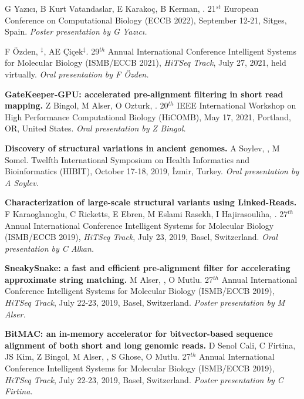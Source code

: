 \vspace{-.2cm}{\bf Identification of protein-protein interaction
bridges in multiple sclerosis.} G Yazıcı, B Kurt Vatandaslar, E Karakoç, B Kerman, \calkan{}.
21$^{st}$ European Conference on Computational Biology (ECCB 2022), September 12-21, Sitges, Spain. 
{\it Poster presentation by G Yazıcı.}

\vspace{-.2cm}{\bf Polishing copy number variant calls on exome sequencing data via deep learning.}
F Özden, \calkan{}$^\ddag$, AE Çiçek$^\ddag$. 29$^{th}$ Annual
International Conference Intelligent Systems for Molecular Biology (ISMB/ECCB 2021), {\em HiTSeq Track},
 July 27, 2021, held virtually. {\it Oral presentation by F Özden.}


\vspace{-.2cm}
{\bf GateKeeper-GPU: accelerated pre-alignment filtering in short read mapping.} Z Bingol, M Alser, O Ozturk, \calkan{}. 20$^{th}$ IEEE International Workshop on High Performance Computational Biology (HiCOMB), May 17, 2021, Portland, OR, United States.
{\it Oral presentation by Z Bingol.}



\vspace{-.2cm}
{\bf Discovery of structural variations in ancient genomes.}
A Soylev, \calkan{}, M Somel. 
Twelfth International Symposium on Health Informatics and Bioinformatics (HIBIT), October 17-18, 2019, İzmir, Turkey.
       {\it Oral presentation by A Soylev.}

       
       
\vspace{-.2cm}
  {\bf Characterization of large-scale structural variants using Linked-Reads.}
  F Karaoglanoglu, C Ricketts, E Ebren, M Eslami Rasekh, I Hajirasouliha, \calkan{}.
27$^{th}$ Annual
International Conference Intelligent Systems for Molecular Biology (ISMB/ECCB 2019), {\em HiTSeq Track},
 July 23, 2019, Basel, Switzerland. {\it Oral presentation by C Alkan.}




\vspace{-.2cm}
  {\bf SneakySnake: a fast and efficient pre-alignment filter for accelerating approximate string matching.}
  M Alser, \calkan{}, O Mutlu.
27$^{th}$ Annual
International Conference Intelligent Systems for Molecular Biology (ISMB/ECCB 2019), {\em HiTSeq Track},
 July 22-23, 2019, Basel, Switzerland. {\it Poster presentation by M Alser.}

\vspace{-.2cm}
   {\bf BitMAC: an in-memory accelerator for bitvector-based sequence alignment of both
short and long genomic reads.}
  D Senol Cali, C Firtina, JS Kim, Z Bingol, M Alser, \calkan{},
S Ghose, O Mutlu.
27$^{th}$ Annual
International Conference Intelligent Systems for Molecular Biology (ISMB/ECCB 2019), {\em HiTSeq Track},
 July 22-23, 2019, Basel, Switzerland. {\it Poster presentation by C Firtina.}


